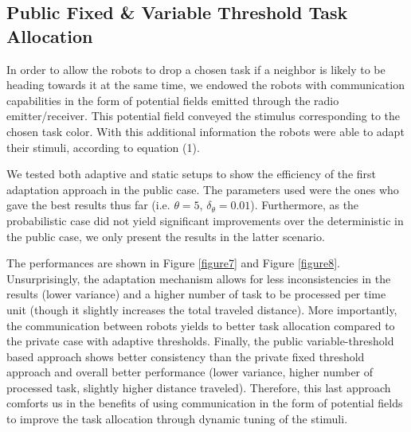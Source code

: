 \subsection{Public Fixed \& Variable Threshold Task Allocation}
In order to allow the robots to drop a chosen task if a neighbor is likely to be heading towards it at the same time, we endowed the robots with communication capabilities in the form of potential fields emitted through the radio emitter/receiver. This potential field conveyed the stimulus corresponding to the chosen task color. With this additional information the robots were able to adapt their stimuli, according to equation (1).

We tested both adaptive and static setups to show the efficiency of the first adaptation approach in the public case. The parameters used were the ones who gave the best results thus far (i.e. $\theta = 5$, $\delta_{\theta} = 0.01$). Furthermore, as the probabilistic case did not yield significant improvements over the deterministic in the public case, we only present the results in the latter scenario.

The performances are shown in Figure \ref{figure7} and Figure \ref{figure8}. Unsurprisingly, the adaptation mechanism allows for less inconsistencies in the results (lower variance) and a higher number of task to be processed per time unit (though it slightly increases the total traveled distance). More importantly, the communication between robots yields to better task allocation compared to the private case with adaptive thresholds. Finally, the public variable-threshold based approach shows better consistency than the private fixed threshold approach and overall better performance (lower variance, higher number of processed task, slightly higher distance traveled). Therefore, this last approach comforts us in the benefits of using communication in the form of potential fields to improve the task allocation through dynamic tuning of the stimuli.

